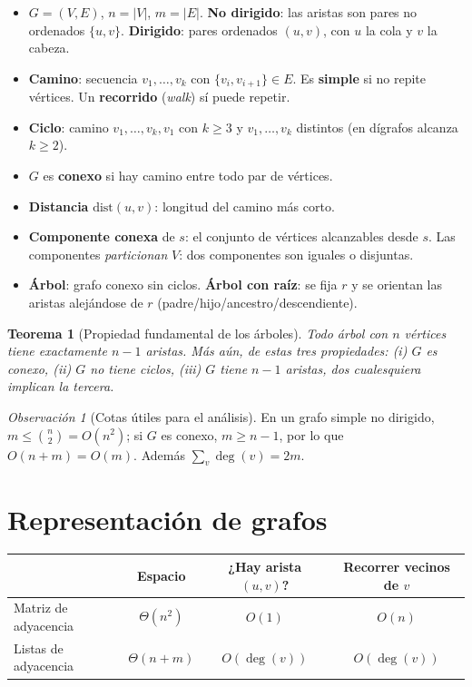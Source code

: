 \documentclass[11pt,a4paper]{article}
\theoremstyle{plain}
\newtheorem{teorema}{Teorema}[section]
\theoremstyle{definition}
\theoremstyle{remark}
\newtheorem*{observacion}{Observación}
\begin{document}
\begin{itemize}
\item $G=(V,E)$, $n=|V|$, $m=|E|$. \textbf{No dirigido}: las aristas son pares no
ordenados $\{u,v\}$. \textbf{Dirigido}: pares ordenados $(u,v)$, con $u$ la cola y
$v$ la cabeza.
\item \textbf{Camino}: secuencia $v_1,\dots,v_k$ con $\{v_i,v_{i+1}\}\in E$. Es
\textbf{simple} si no repite vértices. Un \textbf{recorrido} (\emph{walk}) sí puede
repetir.
\item \textbf{Ciclo}: camino $v_1,\dots,v_k,v_1$ con $k\ge 3$ y $v_1,\dots,v_k$
distintos (en dígrafos alcanza $k\ge 2$).
\item $G$ es \textbf{conexo} si hay camino entre todo par de vértices.
\item \textbf{Distancia} $\mathrm{dist}(u,v)$: longitud del camino más corto.
\item \textbf{Componente conexa} de $s$: el conjunto de vértices alcanzables desde $s$.
Las componentes \emph{particionan} $V$: dos componentes son iguales o disjuntas.
\item \textbf{Árbol}: grafo conexo sin ciclos. \textbf{Árbol con raíz}: se fija $r$ y
se orientan las aristas alejándose de $r$ (padre/hijo/ancestro/descendiente).
\end{itemize}

\begin{teorema}[Propiedad fundamental de los árboles]
Todo árbol con $n$ vértices tiene exactamente $n-1$ aristas. Más aún, de estas tres
propiedades: \emph{(i)} $G$ es conexo, \emph{(ii)} $G$ no tiene ciclos,
\emph{(iii)} $G$ tiene $n-1$ aristas, dos cualesquiera implican la tercera.
\end{teorema}

\begin{observacion}[Cotas útiles para el análisis]
En un grafo simple no dirigido, $m\le \binom{n}{2}=O(n^2)$; si $G$ es conexo,
$m\ge n-1$, por lo que $O(n+m)=O(m)$. Además $\sum_{v}\deg(v)=2m$.
\end{observacion}

\section{Representación de grafos}

\begin{center}\small
\begin{tabular}{@{}lccc@{}}
\toprule
& \textbf{Espacio} & \textbf{¿Hay arista $(u,v)$?} & \textbf{Recorrer vecinos de $v$} \\
\midrule
Matriz de adyacencia & $\Theta(n^2)$ & $O(1)$ & $O(n)$ \\
Listas de adyacencia & $\Theta(n+m)$ & $O(\deg(v))$ & $O(\deg(v))$ \\
\bottomrule
\end{tabular}
\end{center}
\end{document}
